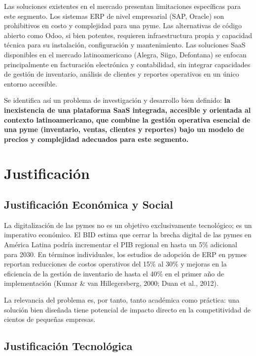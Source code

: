 Las soluciones existentes en el mercado presentan limitaciones específicas para este segmento. Los sistemas ERP de nivel empresarial (SAP, Oracle) son prohibitivos en costo y complejidad para una pyme. Las alternativas de código abierto como Odoo, si bien potentes, requieren infraestructura propia y capacidad técnica para su instalación, configuración y mantenimiento. Las soluciones SaaS disponibles en el mercado latinoamericano (Alegra, Siigo, Defontana) se enfocan principalmente en facturación electrónica y contabilidad, sin integrar capacidades de gestión de inventario, análisis de clientes y reportes operativos en un único entorno accesible.

Se identifica así un problema de investigación y desarrollo bien definido: \textbf{la inexistencia de una plataforma SaaS integrada, accesible y orientada al contexto latinoamericano, que combine la gestión operativa esencial de una pyme (inventario, ventas, clientes y reportes) bajo un modelo de precios y complejidad adecuados para este segmento.}

\section{Justificación}\label{justificaciuxf3n}

\subsection{Justificación Económica y Social}\label{justificaciuxf3n-econuxf3mica-y-social}

La digitalización de las pymes no es un objetivo exclusivamente tecnológico; es un imperativo económico. El BID estima que cerrar la brecha digital de las pymes en América Latina podría incrementar el PIB regional en hasta un 5\% adicional para 2030. En términos individuales, los estudios de adopción de ERP en pymes reportan reducciones de costos operativos del 15\% al 30\% y mejoras en la eficiencia de la gestión de inventario de hasta el 40\% en el primer año de implementación (Kumar \& van Hillegersberg, 2000; Duan et al., 2012).

La relevancia del problema es, por tanto, tanto académica como práctica: una solución bien diseñada tiene potencial de impacto directo en la competitividad de cientos de pequeñas empresas.

\subsection{Justificación Tecnológica}\label{justificaciuxf3n-tecnoluxf3gica}

